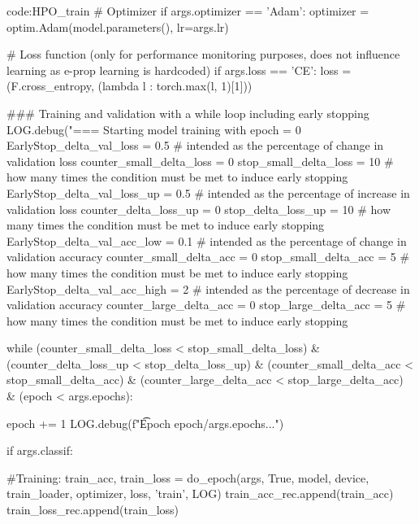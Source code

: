 \begin{mycodebox}{code:HPO_train}
        # Optimizer
        if args.optimizer == 'Adam':
            optimizer = optim.Adam(model.parameters(), lr=args.lr)
        
        # Loss function (only for performance monitoring purposes, does not influence learning as e-prop learning is hardcoded)
        if args.loss == 'CE':
            loss = (F.cross_entropy, (lambda l : torch.max(l, 1)[1]))
        
        ### Training and validation with a while loop including early stopping
        LOG.debug("=== Starting model training with %
        epoch = 0
        EarlyStop_delta_val_loss = 0.5 # intended as the percentage of change in validation loss
        counter_small_delta_loss = 0
        stop_small_delta_loss = 10 # how many times the condition must be met to induce early stopping
        EarlyStop_delta_val_loss_up = 0.5 # intended as the percentage of increase in validation loss
        counter_delta_loss_up = 0
        stop_delta_loss_up = 10 # how many times the condition must be met to induce early stopping
        EarlyStop_delta_val_acc_low = 0.1 # intended as the percentage of change in validation accuracy
        counter_small_delta_acc = 0
        stop_small_delta_acc = 5 # how many times the condition must be met to induce early stopping
        EarlyStop_delta_val_acc_high = 2 # intended as the percentage of decrease in validation accuracy
        counter_large_delta_acc = 0
        stop_large_delta_acc = 5 # how many times the condition must be met to induce early stopping

        while (counter_small_delta_loss < stop_small_delta_loss) & (counter_delta_loss_up < stop_delta_loss_up) & (counter_small_delta_acc < stop_small_delta_acc) & (counter_large_delta_acc < stop_large_delta_acc) & (epoch < args.epochs):
        
            epoch += 1
            LOG.debug(f"\t Epoch {epoch}/{args.epochs}...")

            if args.classif:

                #Training:
                train_acc, train_loss = do_epoch(args, True, model, device, train_loader, optimizer, loss, 'train', LOG)
                train_acc_rec.append(train_acc)
                train_loss_rec.append(train_loss)
                

\end{mycodebox}
